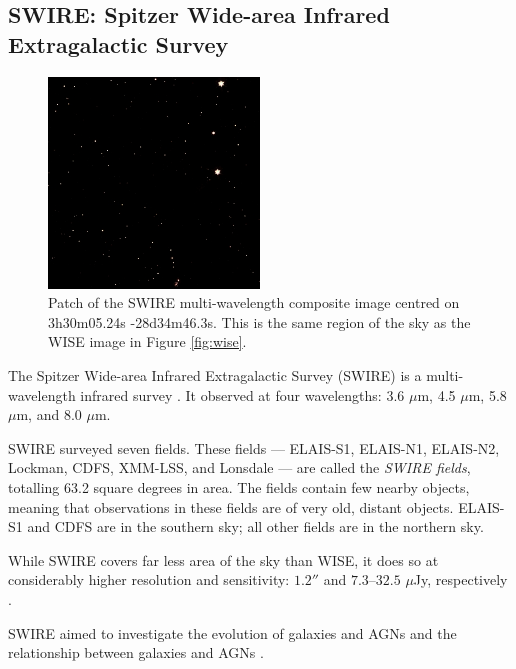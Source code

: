         \subsection{SWIRE: Spitzer Wide-area Infrared Extragalactic Survey}
        \label{sec:swire}

            \begin{figure}
                \centering
                \includegraphics[width=0.5\textwidth]{images/swire_small.jpg}
                \caption{Patch of the SWIRE multi-wavelength composite image
                    centred on 3h30m05.24s -28d34m46.3s. This is the same region
                    of the sky as the WISE image in Figure \ref{fig:wise}.}
            \end{figure}

            The Spitzer Wide-area Infrared Extragalactic Survey (SWIRE) is a
            multi-wavelength infrared survey \citep{lonsdale03}. It observed at
            four wavelengths: 3.6 $\mu$m, 4.5 $\mu$m, 5.8 $\mu$m, and 8.0
            $\mu$m.

            SWIRE surveyed seven fields. These fields --- ELAIS-S1, ELAIS-N1,
            ELAIS-N2, Lockman, CDFS, XMM-LSS, and Lonsdale --- are called the
            \emph{SWIRE fields}, totalling 63.2 square degrees in area. The
            fields contain few nearby objects, meaning that observations in
            these fields are of very old, distant objects. ELAIS-S1 and CDFS are
            in the southern sky; all other fields are in the northern sky.

            While SWIRE covers far less area of the sky than WISE, it does so at
            considerably higher resolution and sensitivity: $1.2''$ and
            $7.3$--$32.5$ $\mu$Jy, respectively \citep{irac-pocket-guide,
            surace05}.

            SWIRE aimed to investigate the evolution of galaxies and AGNs and
            the relationship between galaxies and AGNs \citep{surace05}.

